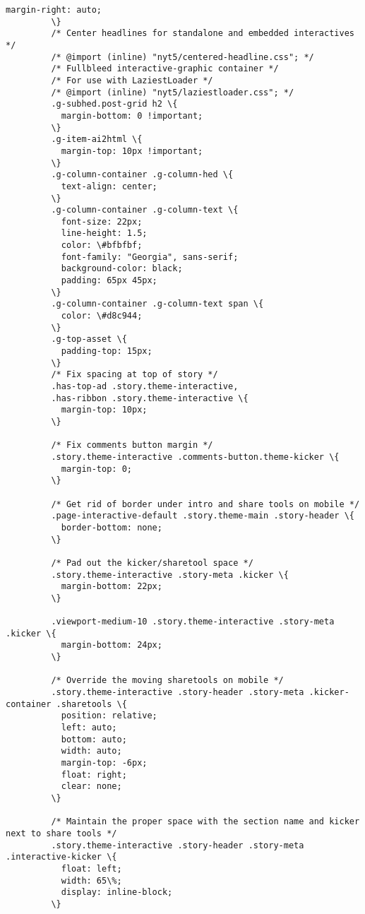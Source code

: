\documentclass[11pt]{article}
\begin{document}
\begin{Verbatim}[commandchars=\\\{\}]
           margin-right: auto;
         \}
         /* Center headlines for standalone and embedded interactives */
         /* @import (inline) "nyt5/centered-headline.css"; */
         /* Fullbleed interactive-graphic container */
         /* For use with LaziestLoader */
         /* @import (inline) "nyt5/laziestloader.css"; */
         .g-subhed.post-grid h2 \{
           margin-bottom: 0 !important;
         \}
         .g-item-ai2html \{
           margin-top: 10px !important;
         \}
         .g-column-container .g-column-hed \{
           text-align: center;
         \}
         .g-column-container .g-column-text \{
           font-size: 22px;
           line-height: 1.5;
           color: \#bfbfbf;
           font-family: "Georgia", sans-serif;
           background-color: black;
           padding: 65px 45px;
         \}
         .g-column-container .g-column-text span \{
           color: \#d8c944;
         \}
         .g-top-asset \{
           padding-top: 15px;
         \}
         /* Fix spacing at top of story */
         .has-top-ad .story.theme-interactive,
         .has-ribbon .story.theme-interactive \{
           margin-top: 10px;
         \}
         
         /* Fix comments button margin */
         .story.theme-interactive .comments-button.theme-kicker \{
           margin-top: 0;
         \}
         
         /* Get rid of border under intro and share tools on mobile */
         .page-interactive-default .story.theme-main .story-header \{
           border-bottom: none;
         \}
         
         /* Pad out the kicker/sharetool space */
         .story.theme-interactive .story-meta .kicker \{
           margin-bottom: 22px;
         \}
         
         .viewport-medium-10 .story.theme-interactive .story-meta .kicker \{
           margin-bottom: 24px;
         \}
         
         /* Override the moving sharetools on mobile */
         .story.theme-interactive .story-header .story-meta .kicker-container .sharetools \{
           position: relative;
           left: auto;
           bottom: auto;
           width: auto;
           margin-top: -6px;
           float: right;
           clear: none;
         \}
         
         /* Maintain the proper space with the section name and kicker next to share tools */
         .story.theme-interactive .story-header .story-meta .interactive-kicker \{
           float: left;
           width: 65\%;
           display: inline-block;
         \}
         

\end{Verbatim}
\end{document}
